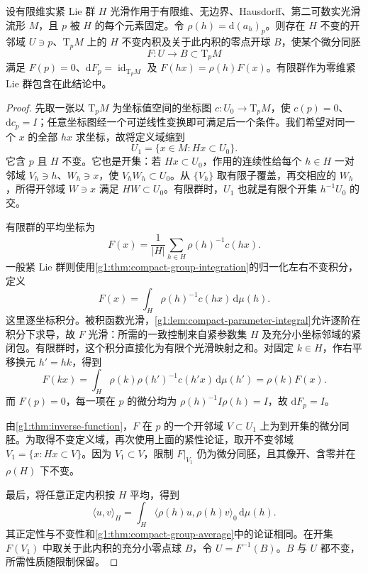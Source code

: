 \begin{proposition}\label{g1:prop:fixed-point-linearization}
	设有限维实紧 Lie 群 \(H\) 光滑作用于有限维、无边界、Hausdorff、第二可数实光滑流形 \(M\)，且 \(p\) 被 \(H\) 的每个元素固定。令 \(\rho(h)=\mathrm{d}(a_h)_p\)。则存在 \(H\) 不变的开邻域 \(U\ni p\)、\(\mathrm{T}_pM\) 上的 \(H\) 不变内积及关于此内积的零点开球 \(B\)，使某个微分同胚
	\[
		F:U\longrightarrow B\subset \mathrm{T}_pM
	\]
	满足 \(F(p)=0\)、\(\mathrm{d}F_p=\operatorname{id}_{\mathrm{T}_pM}\) 及 \(F(hx)=\rho(h)F(x)\)。有限群作为零维紧 Lie 群包含在此结论中。
\end{proposition}
\begin{proof}
	先取一张以 \(\mathrm{T}_pM\) 为坐标值空间的坐标图 \(c:U_0\to \mathrm{T}_pM\)，使 \(c(p)=0\)、\(\mathrm{d}c_p=I\)；任意坐标图经一个可逆线性变换即可满足后一个条件。我们希望对同一个 \(x\) 的全部 \(hx\) 求坐标，故将定义域缩到
	\[
		U_1=\{x\in M:Hx\subset U_0\}.
	\]
	它含 \(p\) 且 \(H\) 不变。它也是开集：若 \(Hx\subset U_0\)，作用的连续性给每个 \(h\in H\) 一对邻域 \(V_h\ni h\)、\(W_h\ni x\)，使 \(V_hW_h\subset U_0\)。从 \(\{V_h\}\) 取有限子覆盖，再交相应的 \(W_h\)，所得开邻域 \(W\ni x\) 满足 \(HW\subset U_0\)。有限群时，\(U_1\) 也就是有限个开集 \(h^{-1}U_0\) 的交。

	有限群的平均坐标为
	\[
		F(x)=\frac1{|H|}\sum_{h\in H}\rho(h)^{-1}c(hx).
	\]
	一般紧 Lie 群则使用\cref{g1:thm:compact-group-integration}的归一化左右不变积分，定义
	\[
		F(x)=\int_H\rho(h)^{-1}c(hx)\,\mathrm{d}\mu(h).
	\]
	这里逐坐标积分。被积函数光滑，\cref{g1:lem:compact-parameter-integral}允许逐阶在积分下求导，故 \(F\) 光滑：所需的一致控制来自紧参数集 \(H\) 及充分小坐标邻域的紧闭包。有限群时，这个积分直接化为有限个光滑映射之和。对固定 \(k\in H\)，作右平移换元 \(h'=hk\)，得到
	\[
		F(kx)=\int_H\rho(k)\rho(h')^{-1}c(h'x)\,\mathrm{d}\mu(h')
		=\rho(k)F(x).
	\]
	而 \(F(p)=0\)，每一项在 \(p\) 的微分均为 \(\rho(h)^{-1}I\rho(h)=I\)，故 \(\mathrm{d}F_p=I\)。

	由\cref{g1:thm:inverse-function}，\(F\) 在 \(p\) 的一个开邻域 \(V\subset U_1\) 上为到开集的微分同胚。为取得不变定义域，再次使用上面的紧性论证，取开不变邻域 \(V_1=\{x:Hx\subset V\}\)。因为 \(V_1\subset V\)，限制 \(F|_{V_1}\) 仍为微分同胚，且其像开、含零并在 \(\rho(H)\) 下不变。

	最后，将任意正定内积按 \(H\) 平均，得到
	\[
		\langle u,v\rangle_H=\int_H\langle\rho(h)u,\rho(h)v\rangle_0\,\mathrm{d}\mu(h).
	\]
	其正定性与不变性和\cref{g1:thm:compact-group-average}中的论证相同。在开集 \(F(V_1)\) 中取关于此内积的充分小零点球 \(B\)，令 \(U=F^{-1}(B)\)。\(B\) 与 \(U\) 都不变，所需性质随限制保留。
\end{proof}

